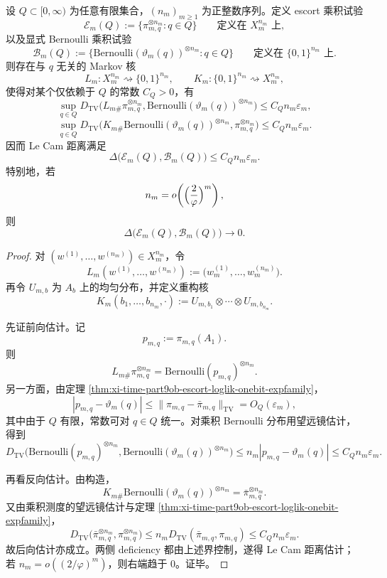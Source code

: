 \begin{theorem}\label{thm:xi-time-part9ob-escort-product-lecam}
设 \(Q\subset[0,\infty)\) 为任意有限集合，\((n_m)_{m\ge 1}\) 为正整数序列。定义 escort 乘积试验
\[
\mathcal E_m(Q):=\{\pi_{m,q}^{\otimes n_m}:q\in Q\}
\qquad\text{定义在 }X_m^{n_m}\text{ 上},
\]
以及显式 Bernoulli 乘积试验
\[
\mathcal B_m(Q):=
\{\mathrm{Bernoulli}(\vartheta_m(q))^{\otimes n_m}:q\in Q\}
\qquad\text{定义在 }\{0,1\}^{n_m}\text{ 上}.
\]
则存在与 \(q\) 无关的 Markov 核
\[
L_m:X_m^{n_m}\rightsquigarrow \{0,1\}^{n_m},
\qquad
K_m:\{0,1\}^{n_m}\rightsquigarrow X_m^{n_m},
\]
使得对某个仅依赖于 \(Q\) 的常数 \(C_Q>0\)，有
\[
\sup_{q\in Q}
D_{\mathrm{TV}}\!\bigl(L_{m\#}\pi_{m,q}^{\otimes n_m},
\mathrm{Bernoulli}(\vartheta_m(q))^{\otimes n_m}\bigr)
\le
C_Q n_m\varepsilon_m,
\]
\[
\sup_{q\in Q}
D_{\mathrm{TV}}\!\bigl(K_{m\#}\mathrm{Bernoulli}(\vartheta_m(q))^{\otimes n_m},
\pi_{m,q}^{\otimes n_m}\bigr)
\le
C_Q n_m\varepsilon_m.
\]
因而 Le Cam 距离满足
\[
\Delta\!\bigl(\mathcal E_m(Q),\mathcal B_m(Q)\bigr)
\le
C_Q n_m\varepsilon_m.
\]
特别地，若
\[
n_m=o\!\left(\Bigl(\frac{2}{\varphi}\Bigr)^m\right),
\]
则
\[
\Delta\!\bigl(\mathcal E_m(Q),\mathcal B_m(Q)\bigr)\longrightarrow 0.
\]
\end{theorem}
\begin{proof}
对 \((w^{(1)},\dots,w^{(n_m)})\in X_m^{n_m}\)，令
\[
L_m(w^{(1)},\dots,w^{(n_m)})
:=
\bigl(w^{(1)}_m,\dots,w^{(n_m)}_m\bigr).
\]
再令 \(U_{m,b}\) 为 \(A_b\) 上的均匀分布，并定义重构核
\[
K_m(b_1,\dots,b_{n_m},\cdot)
:=
U_{m,b_1}\otimes\cdots\otimes U_{m,b_{n_m}}.
\]

先证前向估计。记
\[
p_{m,q}:=\pi_{m,q}(A_1).
\]
则
\[
L_{m\#}\pi_{m,q}^{\otimes n_m}
=
\mathrm{Bernoulli}(p_{m,q})^{\otimes n_m}.
\]
另一方面，由定理 \ref{thm:xi-time-part9ob-escort-loglik-onebit-expfamily}，
\[
|p_{m,q}-\vartheta_m(q)|
\le
\|\pi_{m,q}-\bar\pi_{m,q}\|_{\mathrm{TV}}
=
O_Q(\varepsilon_m),
\]
其中由于 \(Q\) 有限，常数可对 \(q\in Q\) 统一。对乘积 Bernoulli 分布用望远镜估计，得到
\[
D_{\mathrm{TV}}\!\bigl(
\mathrm{Bernoulli}(p_{m,q})^{\otimes n_m},
\mathrm{Bernoulli}(\vartheta_m(q))^{\otimes n_m}
\bigr)
\le
n_m|p_{m,q}-\vartheta_m(q)|
\le
C_Q n_m\varepsilon_m.
\]

再看反向估计。由构造，
\[
K_{m\#}\mathrm{Bernoulli}(\vartheta_m(q))^{\otimes n_m}
=
\bar\pi_{m,q}^{\otimes n_m}.
\]
又由乘积测度的望远镜估计与定理
\ref{thm:xi-time-part9ob-escort-loglik-onebit-expfamily}，
\[
D_{\mathrm{TV}}\!\bigl(\bar\pi_{m,q}^{\otimes n_m},\pi_{m,q}^{\otimes n_m}\bigr)
\le
n_m D_{\mathrm{TV}}(\bar\pi_{m,q},\pi_{m,q})
\le
C_Q n_m\varepsilon_m.
\]
故后向估计亦成立。两侧 deficiency 都由上述界控制，遂得 Le Cam 距离估计；若 \(n_m=o((2/\varphi)^m)\)，则右端趋于 \(0\)。证毕。
\end{proof}


